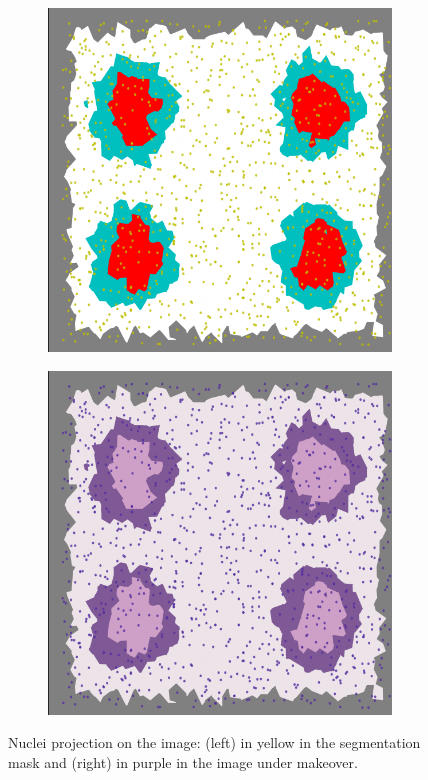 \begin{description}
    \begin{figure}
        \centering
        \begin{subfigure}[t]{0.2\textwidth}
             \centering
             \includegraphics[width = \textwidth]{images/nuclei_mask}
             \label{fig:nuclei_mask}
        \end{subfigure}
        \quad
        \begin{subfigure}[t]{0.2\textwidth}
             \centering
             \includegraphics[width = \textwidth]{images/nuclei_real}
             \label{fig:nuclei_real}
        \end{subfigure}
        \caption{Nuclei projection on the image: (left) in yellow in the segmentation mask and (right) in purple in the image under makeover.}
        \label{fig:nuclei_proj}
    \end{figure}


\end{description}
